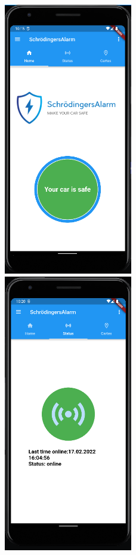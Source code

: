  	\begin{figure}[t]
   \centering
            \includegraphics[width=0.5\textwidth]{Bilder/home.PNG}
			\includegraphics[width=0.5\textwidth]{Bilder/status.PNG}

\end{figure}
